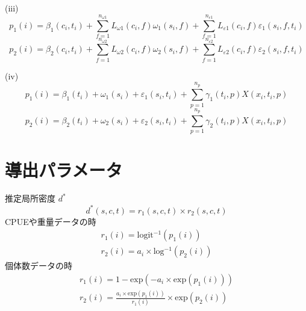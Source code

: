 \documentclass[11pt]{article}
\begin{document}
\hspace{1.2cm} (iii)
\begin{dmath}
  p_1(i) = \beta_{1}(c_{i}, t_{i}) + \sum_{f = 1}^{n_{\omega 1}} L_{\omega 1}(c_i, f) \omega_1(s_i, f) + \sum_{f = 1}^{n_{\varepsilon1}}L_{\varepsilon1}(c_i,f)\varepsilon_1(s_i,f,t_i)
\end{dmath}
\begin{dmath}
  p_2(i) = \beta_{2}(c_{i}, t_{i}) + \sum_{f = 1}^{n_{\omega 2}} L_{\omega 2}(c_i, f) \omega_2(s_i, f) + \sum_{f = 1}^{n_{\varepsilon2}}L_{\varepsilon2}(c_i,f)\varepsilon_2(s_i,f,t_i)
\end{dmath}
\hspace*{2cm}\dotfill

\hspace{1.2cm} (iv)
\begin{dmath}
  p_1(i) = \beta_{1}(t_{i}) + \omega_1(s_i) + \varepsilon_1(s_i,t_i)  +\sum_{p = 1}^{n_p}\gamma_1(t_i,p)X(x_i,t_i,p)
\end{dmath}
\begin{dmath}
  p_2(i) = \beta_{2}(t_{i}) + \omega_2(s_i) + \varepsilon_2(s_i,t_i)  +\sum_{p = 1}^{n_p}\gamma_2(t_i,p)X(x_i,t_i,p)
\end{dmath}

\newpage
{\huge{\section*{導出パラメータ}}}
推定局所密度 $d^*$
\begin{dmath}
d^*(s,c,t) = r_{1}(s,c,t) \times r_{2}(s,c,t)
\end{dmath}
\hspace{1.5cm}CPUEや重量データの時
\begin{eqnarray}
r_{1}(i) = \mathrm{logit^{-1}}(p_{1}(i)) \nonumber \\
r_{2}(i) = a_i \times \mathrm{log^{-1}}(p_{2}(i))
\end{eqnarray}
\hspace{1.5cm}個体数データの時
\begin{eqnarray}
r_{1}(i) = 1 - \mathrm{exp}(-a_i \times \mathrm{exp}(p_{1}(i))) \nonumber \\
r_{2}(i) = \frac{a_{i} \times \mathrm{exp}(p_{1}(i))} {r_{1}(i)} \times \mathrm{exp}(p_{2}(i))
\end{eqnarray}
\hrulefill
\end{document}
